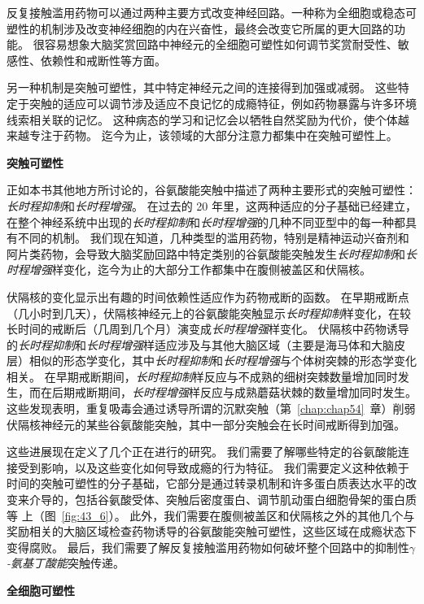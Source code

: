 反复接触滥用药物可以通过两种主要方式改变神经回路。一种称为全细胞或稳态可塑性的机制涉及改变神经细胞的内在兴奋性，最终会改变它所属的更大回路的功能。
很容易想象大脑奖赏回路中神经元的全细胞可塑性如何调节奖赏耐受性、敏感性、依赖性和戒断性等方面。


另一种机制是突触可塑性，其中特定神经元之间的连接得到加强或减弱。
这些特定于突触的适应可以调节涉及适应不良记忆的成瘾特征，例如药物暴露与许多环境线索相关联的记忆。
这种病态的学习和记忆会以牺牲自然奖励为代价，使个体越来越专注于药物。
迄今为止，该领域的大部分注意力都集中在突触可塑性上。


\textbf{突触可塑性}

正如本书其他地方所讨论的，谷氨酸能突触中描述了两种主要形式的突触可塑性：
\textit{长时程抑制}和\textit{长时程增强}。
在过去的 20 年里，这两种适应的分子基础已经建立，在整个神经系统中出现的\textit{长时程抑制}和\textit{长时程增强}的几种不同亚型中的每一种都具有不同的机制。
我们现在知道，几种类型的滥用药物，特别是精神运动兴奋剂和阿片类药物，会导致大脑奖励回路中特定类别的谷氨酸能突触发生\textit{长时程抑制}和\textit{长时程增强}样变化，迄今为止的大部分工作都集中在腹侧被盖区和伏隔核。


伏隔核的变化显示出有趣的时间依赖性适应作为药物戒断的函数。
在早期戒断点（几小时到几天），伏隔核神经元上的谷氨酸能突触显示\textit{长时程抑制}样变化，在较长时间的戒断后（几周到几个月）演变成\textit{长时程增强}样变化。
伏隔核中药物诱导的\textit{长时程抑制}和\textit{长时程增强}样适应涉及与其他大脑区域（主要是海马体和大脑皮层）相似的形态学变化，其中\textit{长时程抑制}和\textit{长时程增强}与个体树突棘的形态学变化相关。
在早期戒断期间，\textit{长时程抑制}样反应与不成熟的细树突棘数量增加同时发生，而在后期戒断期间，\textit{长时程增强}样反应与成熟蘑菇状棘的数量增加同时发生。
这些发现表明，重复吸毒会通过诱导所谓的沉默突触（第~\ref{chap:chap54}~章）削弱伏隔核神经元的某些谷氨酸能突触，其中一部分突触会在长时间戒断得到加强。


这些进展现在定义了几个正在进行的研究。
我们需要了解哪些特定的谷氨酸能连接受到影响，以及这些变化如何导致成瘾的行为特征。
我们需要定义这种依赖于时间的突触可塑性的分子基础，它部分是通过转录机制和许多蛋白质表达水平的改变来介导的，包括谷氨酸受体、突触后密度蛋白、调节肌动蛋白细胞骨架的蛋白质等 上（图~\ref{fig:43_6}）。
此外，我们需要在腹侧被盖区和伏隔核之外的其他几个与奖励相关的大脑区域检查药物诱导的谷氨酸能突触可塑性，这些区域在成瘾状态下变得腐败。
最后，我们需要了解反复接触滥用药物如何破坏整个回路中的抑制性\textit{$\gamma$-氨基丁酸能}突触传递。


\textbf{全细胞可塑性}

